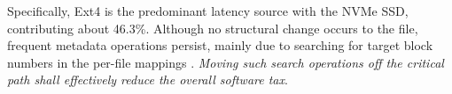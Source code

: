 Specifically,
  Ext4 %
   is the predominant latency
source with the NVMe SSD, contributing about 46.3\%. %
 Although no structural change occurs to the file,
  frequent metadata operations persist, mainly due to searching
  for target block numbers
   in the
per-file mappings \cite{SSD:BypassD:ASPLOS-2024}.
{\em Moving such search operations off the critical path shall effectively
reduce the overall software tax}.

\iftrue
\vspace{1ex}
\noindent{}
\vspace{0.5ex}
\else
\ul{$\vmathbb{O3}$. \em
	For non-preallocated log files, logging writes incur severe  overhead, which  can be mitigated through a preallocation-like strategy.}
\fi

